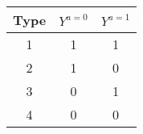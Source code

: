 \documentclass[standalone, version=1.0]{huangfusl-template}
\begin{document}
\begin{tabular}{ccc}
    \toprule
    Type & $Y^{a = 0}$ & $Y^{a = 1}$ \\
    \midrule
    1 & 1 & 1 \\
    2 & 1 & 0 \\
    3 & 0 & 1 \\
    4 & 0 & 0 \\
    \bottomrule
\end{tabular}
\end{document}
